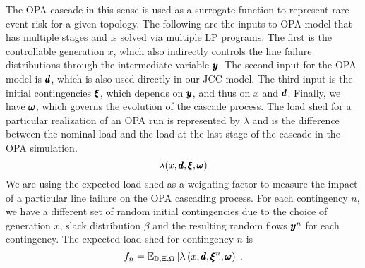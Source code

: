 The OPA cascade in this sense is used as a surrogate function to represent rare event risk for a given topology.  The following are the inputs to OPA model that has multiple stages and is solved via multiple LP programs.  The first is the controllable generation $x$, which also indirectly controls the line failure distributions through the intermediate variable $\pmb{y}$.  The second input for the OPA model is $\pmb{d}$, which is also used directly in our JCC model.  The third input is the initial contingencies $\pmb{\xi}$, which depends on $\pmb{y}$, and thus on $x$ and $\pmb{d}$.  Finally, we have $\pmb{\omega}$, which governs the evolution of the cascade process. The load shed for a particular realization of an OPA run is represented by $\lambda$ and is the difference between the nominal load and the load at the last stage of the cascade in the OPA simulation.
\begin{equation}
\lambda ( x, \pmb{d}, \pmb{\xi}, \pmb{\omega} )
\end{equation}
We are using the expected load shed as a weighting factor to measure the impact of a particular line failure on the OPA cascading process.  For each contingency $n$, we have a different set of random initial contingencies due to the choice of generation $x$, slack distribution $\beta$ and the resulting random flows $\pmb{y}^n$ for each contingency.  The expected load shed for contingency $n$ is
\begin{equation*}
f_n = \mathbb{E}_{\mathbb{D}, \Xi,\Omega} \left[  \lambda\left(x,\pmb{d},\pmb{\xi}^n,\pmb{\omega}\right)  \right].
\end{equation*}



